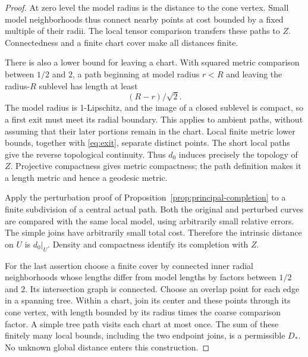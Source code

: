 \begin{proof}
At zero level the model radius is the distance to the cone vertex.
Small model neighborhoods thus connect nearby points at cost
bounded by a fixed multiple of their radii. The local tensor
comparison transfers these paths to \(Z\). Connectedness and a
finite chart cover make all distances finite.

There is also a lower bound for leaving a chart. With squared
metric comparison between \(1/2\) and \(2\), a path beginning at
model radius \(r<R\) and leaving the radius-\(R\) sublevel has
length at least
\begin{equation}\label{eq:exit}
 (R-r)/\sqrt2 .
\end{equation}
The model radius is 1-Lipschitz, and the image of a closed sublevel
is compact, so a first exit must meet its radial boundary.
This applies to ambient paths, without assuming that their later
portions remain in the chart. Local finite metric lower bounds,
together with \eqref{eq:exit}, separate distinct points.
The short local paths give the reverse topological continuity.
Thus \(d_0\) induces precisely the topology of \(Z\).
Projective compactness gives metric compactness; the path definition
makes it a length metric and hence a geodesic metric.

Apply the perturbation proof of
Proposition~\ref{prop:principal-completion} to a finite subdivision
of a central actual path. Both the original and perturbed curves
are compared with the same local model, using arbitrarily small
relative errors. The simple joins have arbitrarily small total
cost. Therefore the intrinsic distance on \(U\) is \(d_0|_U\).
Density and compactness identify its completion with \(Z\).

For the last assertion choose a finite cover by connected inner
radial neighborhoods whose lengths differ from model lengths
by factors between \(1/2\) and \(2\).
Its intersection graph is connected. Choose an overlap point for
each edge in a spanning tree. Within a chart, join its center
and these points through its cone vertex, with length bounded by
its radius times the coarse comparison factor. A simple tree path
visits each chart at most once. The sum of these finitely many
local bounds, including the two endpoint joins, is a permissible
\(D_*\). No unknown global distance enters this construction.
\end{proof}

